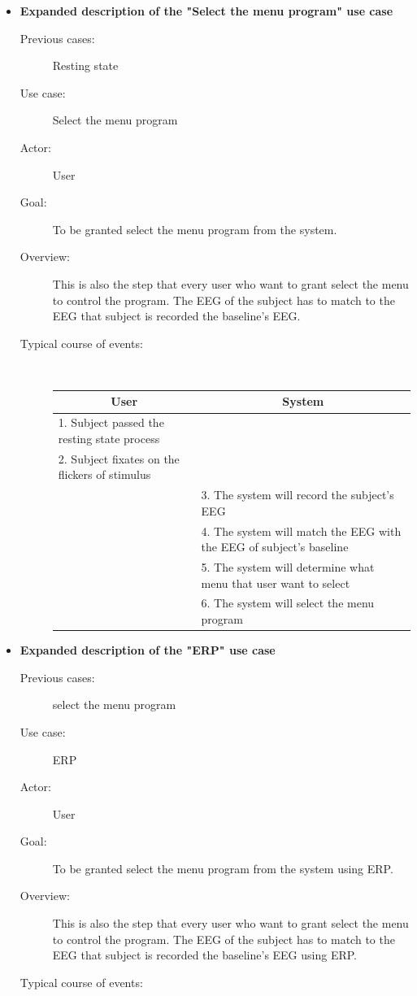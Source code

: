 \begin{itemize}
\begin{description}
{\begin{tabular}{| m{.47\linewidth} | m{.47\linewidth} |}
		\end{tabular}
	}
	
\end{description}

\newpage
\item \textbf{Expanded description of the "Select the menu program" use case }
\begin{description}
	\item [Previous cases:] Resting state
	\item [Use case:] Select the menu program
	\item [Actor:] User  
	\item [Goal:] To be granted select the menu program from the system. 
	\item [Overview:] This is also the step that every user who want to grant select the menu to control the program. The EEG of the subject has to match to the EEG that subject is recorded the baseline’s EEG.
	\item [Typical course of events:]~
	
	{
		\centering
		\begin{tabular}{| m{.47\linewidth} | m{.47\linewidth} |}
			
			\hline 
			\multicolumn{1}{|c}{\textbf{User}} & 
  			\multicolumn{1}{|c|}{\textbf{System}}\\
			\hline 
			1. Subject passed the resting state process &   \\
			\hline 
			2. Subject fixates on the flickers of stimulus   &   \\
			\hline 
			& 3. The system will record the subject’s EEG \\
			\hline 
			& 4. The system will match the EEG with the EEG of subject’s baseline  \\
			\hline
			& 5. The system will determine what menu that user want to select \\
			\hline
			& 6. The system will select the menu program\\
			\hline
			
		\end{tabular}
	}
	
\end{description}

\newpage
\item \textbf{Expanded description of the "ERP" use case }
\begin{description}
	\item [Previous cases:] select the menu program
	\item [Use case:] ERP
	\item [Actor:] User  
	\item [Goal:] To be granted select the menu program from the system using ERP. 
	\item [Overview:] This is also the step that every user who want to grant select the menu to control the program. The EEG of the subject has to match to the EEG that subject is recorded the baseline’s EEG using ERP. 
	\item [Typical course of events:]~
	

\end{description}
\end{itemize}
